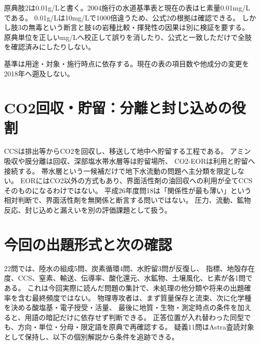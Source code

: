 \begin{tcolorbox}[title=平成30年度問28：単位の誤りと他肢の疑義を分ける]
原典肢2は0.01g/Lと書く。2004施行の水道基準表と現在の表はヒ素量0.01mg/Lである\cite{gc_arsenic2004,gc_arsenic_current}。
0.01g/Lは10mg/Lで1000倍違うため、公式2の根拠は確認できる。
しかし肢3の無毒という断言と肢4の岩種比較・揮発性の因果は別に検証を要する。
原典単位を正しいmg/Lへ校正して誤りを消したり、公式と一致しただけで全肢を確認済みにしたりしない。
\end{tcolorbox}
基準は用途・対象・施行時点に依存する。現在の表の項目数や他成分の変更を2018年へ遡及しない。

\section{CO2回収・貯留：分離と封じ込めの役割}
\label{theory:geochemistry:ccs}
CCSは排出等からCO2を回収し、移送して地中へ貯留する工程である。
アミン吸収や膜分離は回収、深部塩水帯水層等は貯留場所、
CO2-EORは利用と貯留へ接続する\cite{gc_ccs,gc_capture,gc_mea}。
帯水層という一候補だけで地下水流動の問題へ主分類を限定しない。
EORにはCO2以外の方式もあり、界面活性剤の油回収への利用が全てCCSそのものになるわけではない。
平成26年度問18は「関係性が最も薄い」という相対判断で、界面活性剤を無関係と断言する問いではない。
圧力、流動、鉱物反応、封じ込めと漏えいを別の評価課題として扱う。

\section{今回の出題形式と次の確認}
22問では、陸水の組成5問、炭素循環4問、水貯留3問が反復し、
指標、地殻存在度、CCS、窒素、輸送、伝導率、酸化還元、水鉱物、土壌風化、ヒ素が各1問である。
これは今回実際に読んだ問題の集計で、未処理の他分類や将来の出題確率を含む最終頻度ではない。
物理専攻者は、まず質量保存と流束、次に化学種を決める酸塩基・電子授受・活量、
最後に地質・生物・測定時点の条件を加えると、用語の暗記だけに依存せず判断できる。
正答位置が入れ替わった同型でも、方向・単位・分母・限定語を原典で再確認する。
疑義11問はAstra査読対象として保持し、以下の個別解説から条件を追跡できる。

